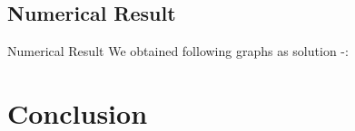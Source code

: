 \documentclass[8pt]{beamer}
\begin{document}
				\subsection{Numerical Result}
				\begin{frame}{Numerical Result}
					We obtained following graphs as solution -: \\
					
				\end{frame}
				\section{Conclusion}
					\begin{frame}
					
					\end{frame}
\end{document}
